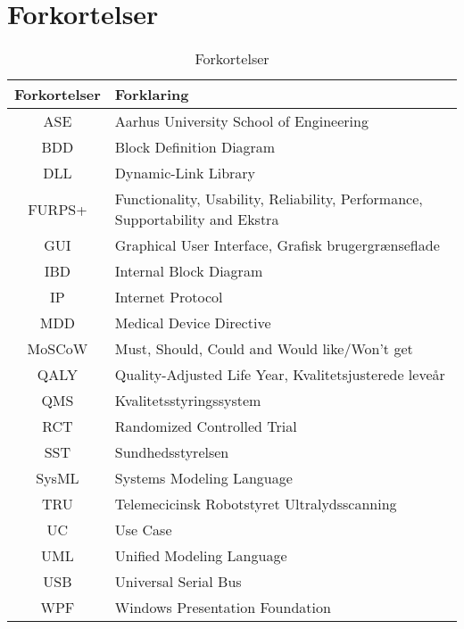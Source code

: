 \chapter{Forkortelser}

\begin{table}[htb]
\centering
\begin{tabular}{ | c | p{} | }
\hline
\textbf{Forkortelser} & \textbf{Forklaring} \\\hline
ASE & Aarhus University School of Engineering \\\hline
BDD & Block Definition Diagram \\\hline
DLL & Dynamic-Link Library \\\hline
FURPS+ & Functionality, Usability, Reliability, Performance, Supportability and Ekstra \\\hline
GUI & Graphical User Interface, Grafisk brugergrænseflade \\\hline
IBD & Internal Block Diagram \\\hline
IP & Internet Protocol \\\hline
MDD & Medical Device Directive \\\hline
MoSCoW & Must, Should, Could and Would like/Won't get\\\hline
QALY & Quality-Adjusted Life Year, Kvalitetsjusterede leveår  \\\hline
QMS & Kvalitetsstyringssystem \\\hline
RCT & Randomized Controlled Trial \\\hline
SST & Sundhedsstyrelsen \\\hline
SysML & Systems Modeling Language \\\hline
TRU & Telemecicinsk Robotstyret Ultralydsscanning \\\hline
UC & Use Case \\\hline
UML & Unified Modeling Language \\\hline
USB & Universal Serial Bus \\\hline
WPF & Windows Presentation Foundation \\\hline

\end{tabular}
\caption{Forkortelser}
\end{table}

\vspace{3cm}